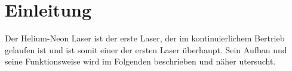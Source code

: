 \section{Einleitung}
Der Helium-Neon Laser ist der erste Laser, der im kontinuierlichem Bertrieb gelaufen ist und ist somit einer der ersten Laser überhaupt.
Sein Aufbau und seine Funktionsweise wird im Folgenden beschrieben und näher utersucht.
